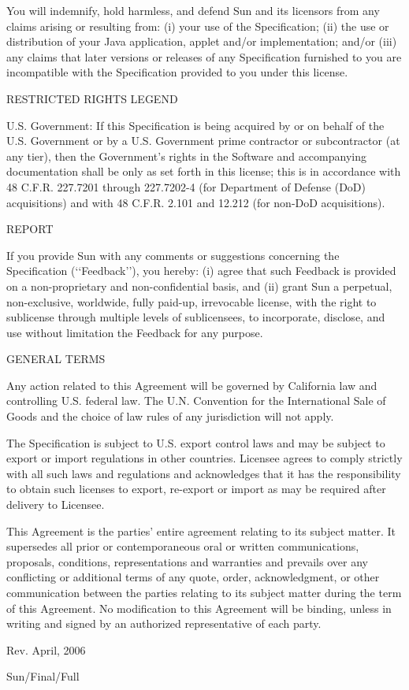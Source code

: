 You will indemnify, hold harmless, and defend Sun and its licensors from
any claims arising or resulting from: (i) your use of the Specification;
(ii) the use or distribution of your Java application, applet and/or
implementation; and/or (iii) any claims that later versions or releases
of any Specification furnished to you are incompatible with the
Specification provided to you under this license.


RESTRICTED RIGHTS LEGEND


U.S. Government: If this Specification is being acquired by or on behalf
of the U.S. Government or by a U.S. Government prime contractor or
subcontractor (at any tier), then the Government's rights in the
Software and accompanying documentation shall be only as set forth in
this license; this is in accordance with 48 C.F.R. 227.7201 through
227.7202-4 (for Department of Defense (DoD) acquisitions) and with 48
C.F.R. 2.101 and 12.212 (for non-DoD acquisitions).


REPORT


If you provide Sun with any comments or suggestions concerning the
Specification (\lq\lq Feedback\rq\rq), you hereby: (i) agree that such Feedback is
provided on a non-proprietary and non-confidential basis, and (ii) grant
Sun a perpetual, non-exclusive, worldwide, fully paid-up, irrevocable
license, with the right to sublicense through multiple levels of
sublicensees, to incorporate, disclose, and use without limitation the
Feedback for any purpose.


GENERAL TERMS


Any action related to this Agreement will be governed by California law
and controlling U.S. federal law. The U.N. Convention for the
International Sale of Goods and the choice of law rules of any
jurisdiction will not apply.


The Specification is subject to U.S. export control laws and may be
subject to export or import regulations in other countries. Licensee
agrees to comply strictly with all such laws and regulations and
acknowledges that it has the responsibility to obtain such licenses to
export, re-export or import as may be required after delivery to Licensee.


This Agreement is the parties' entire agreement relating to its subject
matter. It supersedes all prior or contemporaneous oral or written
communications, proposals, conditions, representations and warranties
and prevails over any conflicting or additional terms of any quote,
order, acknowledgment, or other communication between the parties
relating to its subject matter during the term of this Agreement. No
modification to this Agreement will be binding, unless in writing and
signed by an authorized representative of each party.




Rev. April, 2006

Sun/Final/Full

